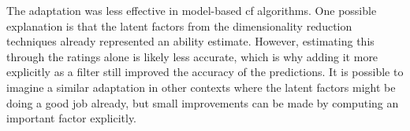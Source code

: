 The adaptation was less effective in model-based \gls{cf} algorithms.
One possible explanation is that the latent factors from the dimensionality reduction techniques already represented an ability estimate.
However, estimating this through the ratings alone is likely less accurate, which is why adding it more explicitly as a filter still improved the accuracy of the predictions.
It is possible to imagine a similar adaptation in other contexts where the latent factors might be doing a good job already, but small improvements can be made by computing an important factor explicitly.

